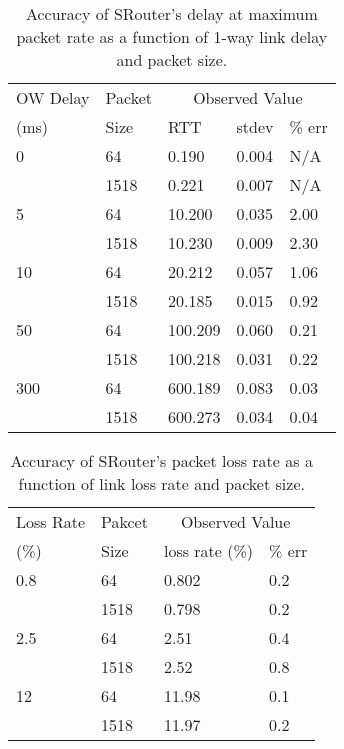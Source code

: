 \documentclass[conference]{IEEEtran}
\begin{document}
\begin{table}[!tb]
  \caption{Accuracy of SRouter's delay at maximum packet rate as a
    function of 1-way link delay and packet size.}
  \begin{tabular}{ | p{1.2cm} | p{1cm} || p{1.33cm} | p{1.33cm} | p{1.33cm} | }
    \hline
    OW Delay & Packet & \multicolumn{3}{c|}{Observed Value} \\
    (ms)   & Size   & RTT & stdev & \% err\\
    \hline
    0 & 64 & 0.190 & 0.004 & N/A \\
    & 1518 & 0.221 & 0.007 & N/A \\
    \hline
    5 & 64 & 10.200 & 0.035 & 2.00 \\
    & 1518 & 10.230 & 0.009 & 2.30 \\
    \hline
    10 & 64 & 20.212 & 0.057 & 1.06\\
    & 1518 & 20.185 & 0.015& 0.92 \\
    \hline
    50 & 64 & 100.209 & 0.060 & 0.21 \\
    & 1518 & 100.218 & 0.031 & 0.22 \\
    \hline
    300 & 64 & 600.189 & 0.083 & 0.03 \\
    & 1518 & 600.273 & 0.034 & 0.04 \\
    \hline
  \end{tabular}
  \label{sec:evaluation:tab:delay}
\end{table}


\begin{table}[!tb]
  \caption{Accuracy of SRouter's packet loss rate as a function of link loss rate and packet size.}
  \begin{tabular}{ | p{1.2cm} | p{1cm} || p{2.2cm} | p{2.2cm} | }
    \hline
    Loss Rate & Pakcet & \multicolumn{2}{c|}{Observed Value} \\
    (\%)    & Size   & loss rate (\%) & \% err \\
    \hline
    0.8 & 64 & 0.802 & 0.2 \\
    & 1518 & 0.798 & 0.2 \\
    \hline
    2.5 & 64 & 2.51 & 0.4 \\
    & 1518 & 2.52 & 0.8 \\
    \hline
    12 & 64 & 11.98 & 0.1 \\
    & 1518 & 11.97 & 0.2 \\
    \hline
  \end{tabular}
  \label{sec:evaluation:tab:lossrate}
\end{table}
\end{document}
